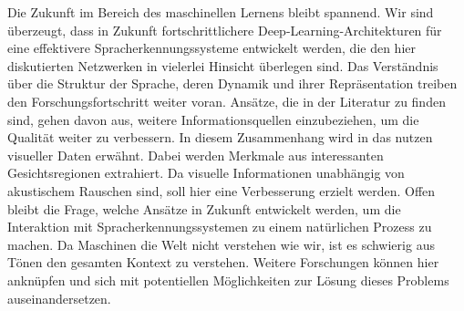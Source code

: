 Die Zukunft im Bereich des maschinellen Lernens bleibt spannend. Wir sind überzeugt, dass in Zukunft fortschrittlichere Deep-Learning-Architekturen für eine effektivere Spracherkennungssysteme entwickelt werden, die den hier diskutierten Netzwerken in vielerlei Hinsicht überlegen sind. Das Verständnis über die Struktur der Sprache, deren Dynamik und ihrer Repräsentation treiben den Forschungsfortschritt weiter voran. Ansätze, die in der Literatur zu finden sind, gehen davon aus, weitere Informationsquellen einzubeziehen, um die Qualität weiter zu verbessern. In diesem Zusammenhang wird in {\cite{Yu.2014}} das nutzen visueller Daten erwähnt. Dabei werden Merkmale aus interessanten Gesichtsregionen extrahiert. Da visuelle Informationen unabhängig von akustischem Rauschen sind, soll hier eine Verbesserung erzielt werden. Offen bleibt die Frage, welche Ansätze in Zukunft entwickelt werden, um die Interaktion mit Spracherkennungssystemen zu einem natürlichen Prozess zu machen. Da Maschinen die Welt nicht verstehen wie wir, ist es schwierig aus Tönen den gesamten Kontext zu verstehen. Weitere Forschungen können hier anknüpfen und sich mit potentiellen Möglichkeiten zur Lösung dieses Problems auseinandersetzen.

\ifCLASSOPTIONcaptionsoff
  \newpage
\fi